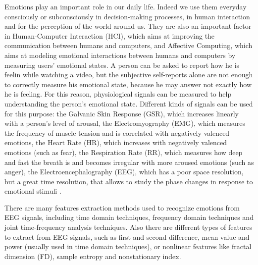 \documentclass[10pt,journal,A4paper,compsoc,epsfig]{IEEEtran}
\begin{document}
Emotions play an important role in our daily life. Indeed we use them everyday consciously or subconsciously in decision-making processes, in human interaction and for the perception of the world around us.
They are also an important factor in Human-Computer Interaction (HCI), which aims at improving the communication between humans and computers, and Affective Computing, which aims at modeling emotional interactions between humans and computers by measuring users' emotional states. 
A person can be asked to report how he is feelin while watching a video, but the subjective self-reports alone are not enough to correctly measure his emotional state, because he may answer not exactly how he is feeling. For this reason, physiological signals can be measured to help understanding the person's emotional state. Different kinds of signals can be used for this purpose: the Galvanic Skin Response (GSR), which increases linearly with a person's level of arousal, the Electromyography (EMG), which measures the frequency of muscle tension and is correlated with negatively valenced emotions, the Heart Rate (HR), which increases with negatively valenced emotions (such as fear), the Respiration Rate (RR), which measures how deep and fast the breath is and becomes irregular with more aroused emotions (such as anger), the Electroencephalography (EEG), which has a poor space resolution, but a great time resolution, that allows to study the phase changes in response to emotional stimuli \cite{zhuang2017emotion, alarcao2017emotions}.


There are many features extraction methods used to recognize emotions from EEG signals, including time domain techniques, frequency domain techniques and joint time-frequency analysis techniques. Also there are different types of features to extract from EEG signals, such as first and second difference, mean value and power (usually used in time domain techniques), or nonlinear features like fractal dimension (FD), sample entropy and nonstationary index.
\end{document}
